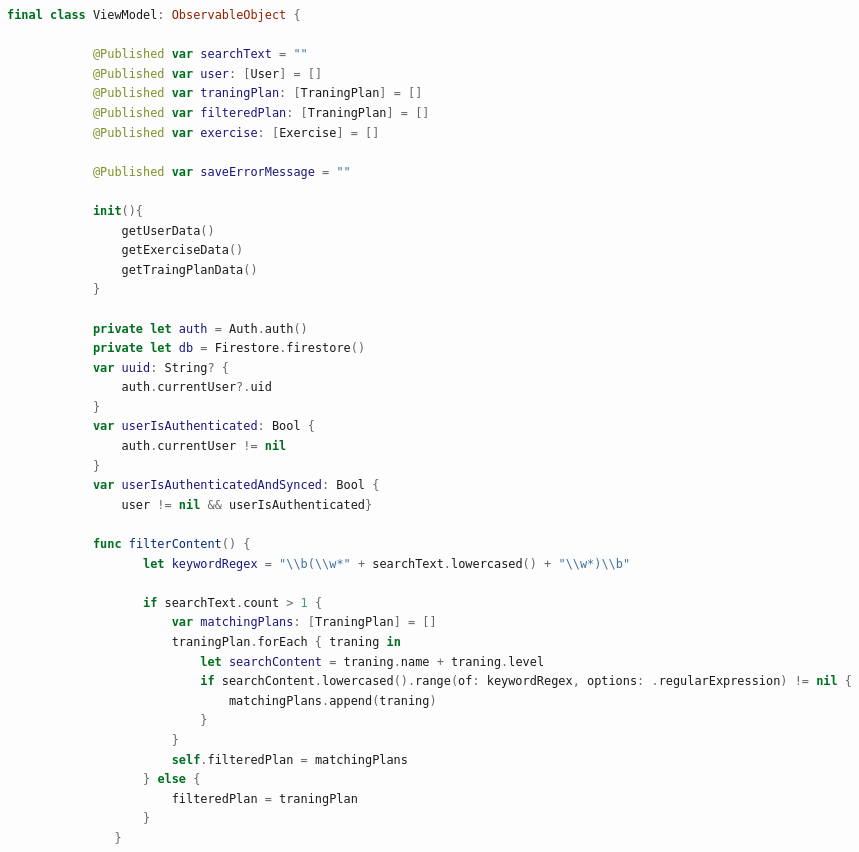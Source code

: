 \begin{spacing}{2}
\end{spacing}
\begin{minipage}{\textwidth}
    \linespread{0.8}\selectfont
    \begin{lstlisting}[language=swift]
        final class ViewModel: ObservableObject {
    
            @Published var searchText = ""
            @Published var user: [User] = []
            @Published var traningPlan: [TraningPlan] = []
            @Published var filteredPlan: [TraningPlan] = []
            @Published var exercise: [Exercise] = []
            
            @Published var saveErrorMessage = ""
            
            init(){
                getUserData()
                getExerciseData()
                getTraingPlanData()
            }
            
            private let auth = Auth.auth()
            private let db = Firestore.firestore()
            var uuid: String? {
                auth.currentUser?.uid
            }
            var userIsAuthenticated: Bool {
                auth.currentUser != nil
            }
            var userIsAuthenticatedAndSynced: Bool {
                user != nil && userIsAuthenticated}
            
            func filterContent() {
                   let keywordRegex = "\\b(\\w*" + searchText.lowercased() + "\\w*)\\b"
        
                   if searchText.count > 1 {
                       var matchingPlans: [TraningPlan] = []
                       traningPlan.forEach { traning in
                           let searchContent = traning.name + traning.level
                           if searchContent.lowercased().range(of: keywordRegex, options: .regularExpression) != nil {
                               matchingPlans.append(traning)
                           }
                       }
                       self.filteredPlan = matchingPlans
                   } else {
                       filteredPlan = traningPlan
                   }
               }
    \end{lstlisting}   
\end{minipage}

